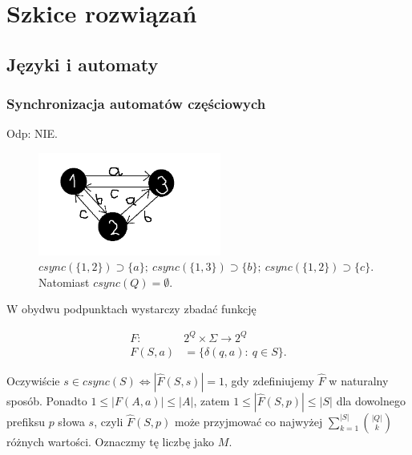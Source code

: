\documentclass[a4paper,11pt]{article}
\newenvironment{zadanie}[1]
  {\renewcommand\theinnercustomthm{#1}\innercustomthm}
  {\endinnercustomthm}
\begin{document}
\section{Szkice rozwiązań}

\subsection{Języki i automaty}

\subsubsection{Synchronizacja automatów częściowych}

\begin{zadanie}{40}
\end{zadanie}

Odp: NIE. \\


\begin{figure}[h!]
  \centerline{%
    \includegraphics[width=6cm]{zad40.png}%
  }%
  \caption{$csync(\{1,2\}) \supset \{a\}; \ csync(\{1,3\}) \supset \{b\};\ csync(\{1,2\}) \supset \{c\}$. Natomiast $csync(Q) = \emptyset $.}
\end{figure}


\begin{zadanie}{41}
\end{zadanie}
W obydwu podpunktach wystarczy zbadać funkcję

\begin{align*}
 F :\ &2^Q \times \Sigma \longrightarrow 2^Q \\
 F(S,a) &= \{ \delta(q,a) : \ q \in S \}.
\end{align*}

Oczywiście $s \in csync(S) \Longleftrightarrow |\widehat{F}(S,s)| = 1$, gdy zdefiniujemy $\widehat{F}$ w naturalny sposób. 
Ponadto $1 \leqslant |F(A,a)| \leqslant |A|$, zatem $1 \leqslant |\widehat{F}(S,p)| \leqslant |S|$ dla dowolnego prefiksu $p$ słowa $s$,
czyli $\widehat{F}(S,p)$ może przyjmować co najwyżej $\displaystyle{\sum\limits^{|S|}_{k=1}\binom{|Q|}{k}}$ różnych wartości.
Oznaczmy tę liczbę jako $M$. \\ \\
\end{document}
